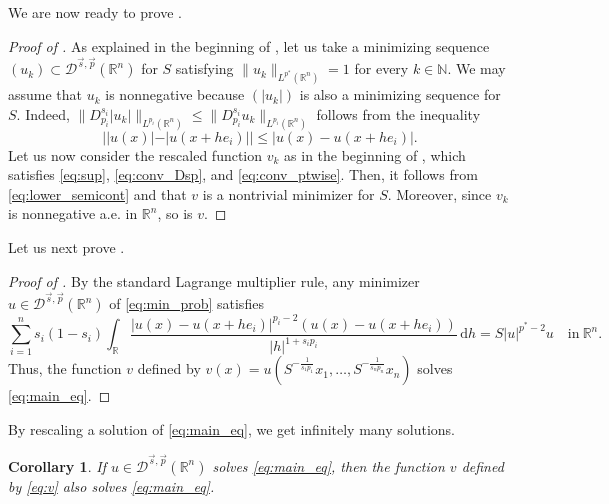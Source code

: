 \documentclass[11pt]{amsart}
\theoremstyle{plain}
\newtheorem{corollary}[theorem]{Corollary}
\theoremstyle{definition}
\numberwithin{equation}{section}
\newcommand{\R}{\mathbb{R}}
\newcommand{\Dsp}{\mathcal{D}^{\vec{s},\vec{p}}(\mathbb{R}^n)}
\begin{document}
We are now ready to prove .

\begin{proof} [Proof of ]
As explained in the beginning of , let us take a minimizing sequence $(u_k) \subset \Dsp$ for $S$ satisfying $\|u_k\|_{L^{p^{\ast}}(\mathbb{R}^n)} = 1$ for every $k \in \mathbb{N}$. We may assume that $u_k$ is nonnegative because $(|u_k|)$ is also a minimizing sequence for $S$. Indeed, $\|D^{s_i}_{p_i} |u_k| \|_{L^{p_i}(\mathbb{R}^n)} \leq \|D^{s_i}_{p_i}u_k \|_{L^{p_i}(\mathbb{R}^n)}$ follows from the inequality
\begin{equation*}
||u(x)|-|u(x+he_i)|| \leq |u(x)-u(x+he_i)|.
\end{equation*}
Let us now consider the rescaled function $v_k$ as in the beginning of , which satisfies \eqref{eq:sup}, \eqref{eq:conv_Dsp}, and \eqref{eq:conv_ptwise}. Then, it follows from \eqref{eq:lower_semicont} and  that $v$ is a nontrivial minimizer for $S$. Moreover, since $v_k$ is nonnegative a.e. in $\mathbb{R}^n$, so is $v$.
\end{proof}

Let us next prove .

\begin{proof} [Proof of ]
By the standard Lagrange multiplier rule, any minimizer $u \in \mathcal{D}^{\vec{s},\vec{p}}(\R^n)$ of \eqref{eq:min_prob} satisfies
\begin{equation*}
\sum_{i=1}^n s_i(1-s_i) \int_{\mathbb{R}} \frac{|u(x)-u(x+he_i)|^{p_i-2}(u(x)-u(x+he_i))}{|h|^{1+s_ip_i}} \,\mathrm{d}h = S|u|^{p^{\ast}-2}u \quad \text{in}~ \mathbb{R}^n.
\end{equation*}
Thus, the function $v$ defined by $v(x) = u(S^{-\frac{1}{s_1p_1}}x_1, \dots, S^{-\frac{1}{s_np_n}}x_n)$ solves \eqref{eq:main_eq}.
\end{proof}

By rescaling a solution of \eqref{eq:main_eq}, we get infinitely many solutions.

\begin{corollary}
If $u \in \mathcal{D}^{\vec{s},\vec{p}}(\R^n)$ solves \eqref{eq:main_eq}, then the function $v$ defined by \eqref{eq:v} also solves \eqref{eq:main_eq}.
\end{corollary}
\end{document}
